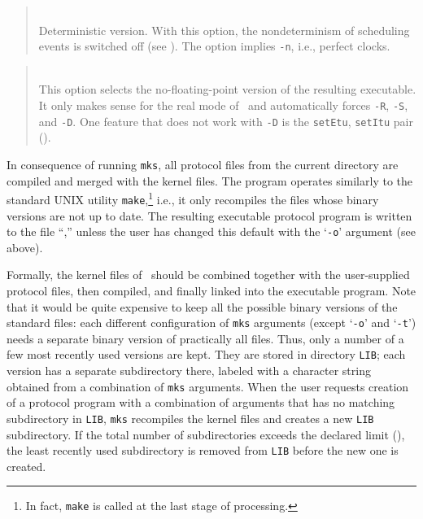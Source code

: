 \begin{quote}
\noindent{}\\ \hspace{0in}
Deterministic version.
With this option, the nondeterminism of scheduling events is switched off
(see ).
The option implies {\tt -n}, i.e., perfect clocks.
\end{quote}\medskip

\begin{quote}
\noindent{}\\ \hspace{0in}
This option selects the no-floating-point version of the resulting
executable.
It only makes sense for the real mode of \smurph\ and automatically
forces {\tt -R}, {\tt -S}, and {\tt -D}.
One feature that does not work with {\tt -D} is the {\tt setEtu},
{\tt setItu} pair ().
\end{quote}\medskip

In consequence of running {\tt mks}, all protocol files from the current
directory are compiled and merged with the kernel files.
The program operates similarly to the standard UNIX utility
{\tt make},\footnote{In fact, {\tt make} is called at the last
stage of processing.} i.e.,
it only recompiles the files whose binary versions are not up to date.
The resulting executable protocol program is written to the file
``\smurphtts,'' unless the user has changed this default with the
`{\tt -o}' argument (see above).

Formally, the kernel files of \smurph\ should be combined
together with the user-supplied protocol files, then compiled, and finally
linked into the executable program.
Note that it would be quite expensive to keep all the possible binary versions
of the standard files: each different configuration of {\tt mks} arguments
(except `{\tt -o}' and `{\tt -t}')
needs a separate binary version of practically all files.
Thus, only a number of a few most recently used versions are kept.
They are stored in directory {\tt LIB}; each version has a separate
subdirectory there, labeled with a character string obtained from a
combination of {\tt mks} arguments.
When the user requests creation of a protocol program with a combination
of arguments that has no matching subdirectory in {\tt LIB}, {\tt mks}
recompiles the kernel files and creates a new {\tt LIB} subdirectory.
If the total number of subdirectories exceeds the declared limit
(), the least recently used subdirectory is removed from
{\tt LIB} before the new one is created.

